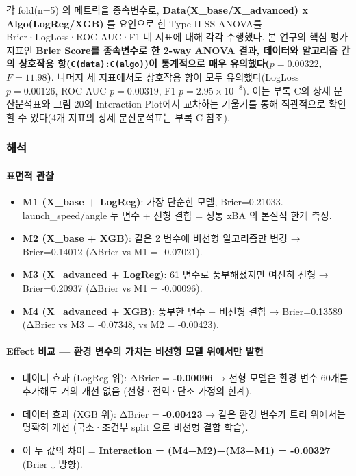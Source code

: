 \documentclass[
  11.5pt,
]{article}
\providecommand{\tightlist}{%
  \setlength{\itemsep}{0pt}\setlength{\parskip}{0pt}}
\begin{document}
각 fold(n=5) 의 메트릭을 종속변수로, \textbf{Data(X\_base/X\_advanced) x
Algo(LogReg/XGB)} 를 요인으로 한 Type II SS ANOVA를 Brier·LogLoss·ROC
AUC·F1 네 지표에 대해 각각 수행했다. 본 연구의 핵심 평가 지표인
\textbf{Brier Score를 종속변수로 한 2-way ANOVA 결과, 데이터와 알고리즘
간의 상호작용 항(\texttt{C(data):C(algo)})이 통계적으로 매우
유의했다(\(p = 0.00322\), \(F = 11.98\))}. 나머지 세 지표에서도 상호작용
항이 모두 유의했다(LogLoss \(p = 0.00126\), ROC AUC \(p = 0.00319\), F1
\(p = 2.95 \times 10^{-8}\)). 이는 부록 C의 상세 분산분석표와 그림 20의
Interaction Plot에서 교차하는 기울기를 통해 직관적으로 확인할 수
있다(4개 지표의 상세 분산분석표는 부록 C 참조).

\subsubsection{해석}\label{uxd574uxc11d}

\paragraph{표면적 관찰}\label{uxd45cuxba74uxc801-uxad00uxcc30}

\begin{itemize}
\tightlist
\item
  \textbf{M1 (X\_base + LogReg)}: 가장 단순한 모델, Brier=0.21033.
  launch\_speed/angle 두 변수 + 선형 결합 = 정통 xBA 의 본질적 한계
  측정.
\item
  \textbf{M2 (X\_base + XGB)}: 같은 2 변수에 비선형 알고리즘만 변경 →
  Brier=0.14012 (ΔBrier vs M1 = -0.07021).
\item
  \textbf{M3 (X\_advanced + LogReg)}: 61 변수로 풍부해졌지만 여전히 선형
  → Brier=0.20937 (ΔBrier vs M1 = -0.00096).
\item
  \textbf{M4 (X\_advanced + XGB)}: 풍부한 변수 + 비선형 결합 →
  Brier=0.13589 (ΔBrier vs M3 = -0.07348, vs M2 = -0.00423).
\end{itemize}

\paragraph{Effect 비교 --- 환경 변수의 가치는 비선형 모델 위에서만
발현}\label{effect-uxbe44uxad50-uxd658uxacbd-uxbcc0uxc218uxc758-uxac00uxce58uxb294-uxbe44uxc120uxd615-uxbaa8uxb378-uxc704uxc5d0uxc11cuxb9cc-uxbc1cuxd604}

\begin{itemize}
\tightlist
\item
  데이터 효과 (LogReg 위): ΔBrier = \textbf{-0.00096} → 선형 모델은 환경
  변수 60개를 추가해도 거의 개선 없음 (선형·전역·단조 가정의 한계).
\item
  데이터 효과 (XGB 위): ΔBrier = \textbf{-0.00423} → 같은 환경 변수가
  트리 위에서는 명확히 개선 (국소·조건부 split 으로 비선형 결합 학습).
\item
  이 두 값의 차이 = \textbf{Interaction = (M4−M2)−(M3−M1) = -0.00327}
  (Brier ↓ 방향).
\end{itemize}
\end{document}
